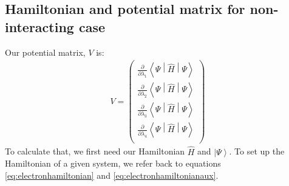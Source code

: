 \documentclass{aux/ttuthes2007}
\newcommand{\ket}[1]{\ensuremath{\left|#1\right\rangle}}
\newcommand{\sandwich}[3]{\left< #1 \middle\vert #2 \middle\vert #3 \right>}
\newcommand{\pd}[1]{\frac{\partial}{\partial #1}}
\begin{document}
\subsection{\textbf{Hamiltonian and potential matrix for non-interacting case}}

Our potential matrix, $V$ is:
%
\begin{equation*}
	\begin{split}
		V = \begin{pmatrix}
			\pd {\lambda_1} \sandwich {\Psi}{\hat H}{\Psi}\\
			\pd {\lambda_2} \sandwich {\Psi}{\hat H}{\Psi}\\
			\pd {\lambda_3} \sandwich {\Psi}{\hat H}{\Psi}\\
			\pd {\lambda_4} \sandwich {\Psi}{\hat H}{\Psi}\\
		\end{pmatrix}
	\end{split}
\end{equation*}
%
To calculate that, we first need our Hamiltonian $\hat H$ and $\ket \Psi$. To set up the Hamiltonian of a given system, we refer back to equations \ref{eq:electronhamiltonian} and \ref{eq:electronhamiltonianaux}. 
\end{document}
